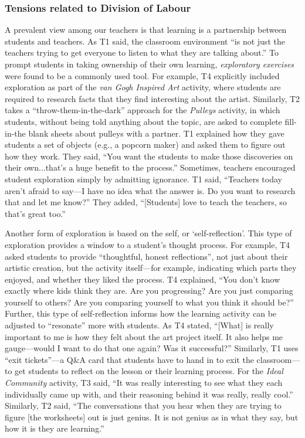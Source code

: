 \subsubsection{Tensions related to Division of Labour}
\label{sec:13}
A prevalent view among our teachers is that learning is a partnership between students and teachers.  As T1 said, the classroom environment ``is not just the teachers trying to get everyone to listen to what they are talking about.'' To prompt students in taking ownership of their own learning, \textit{exploratory exercises} were found to be a commonly used tool.  For example, T4 explicitly included exploration as part of the \textit{van Gogh Inspired Art} activity, where students are required to research facts that they find interesting about the artist.  Similarly, T2 takes a ``throw-them-in-the-dark'' approach for the \textit{Pulleys} activity, in which students, without being told anything about the topic, are asked to complete fill-in-the blank sheets about pulleys with a partner. T1 explained how they gave students a set of objects (e.g., a popcorn maker) and asked them to figure out how they work.  They said, ``You want the students to make those discoveries on their own...that's a huge benefit to the process.'' Sometimes, teachers encouraged student exploration simply by admitting ignorance. T1 said, ``Teachers today aren't afraid to say---I have no idea what the answer is.  Do you want to research that and let me know?'' They added, ``[Students] love to teach the teachers, so that's great too.'' 

Another form of exploration is based on the self, or `self-reflection'. This type of exploration provides a window to a student's thought process. For example, T4 asked students to provide ``thoughtful, honest reflections'', not just about their artistic creation, but the activity itself---for example, indicating which parts they enjoyed, and whether they liked the process. T4 explained, ``You don't know exactly where kids think they are.  Are you progressing?  Are you just comparing yourself to others?  Are you comparing yourself to what you think it should be?''  Further, this type of self-reflection informs how the learning activity can be adjusted to ``resonate'' more with students.  As T4 stated, ``[What] is really important to me is how they felt about the art project itself.  It also helps me gauge---would I want to do that one again? Was it successful?'' Similarly, T1 uses ``exit tickets''---a Q\&A card that students have to hand in to exit the classroom---to get students to reflect on the lesson or their learning process. For the \textit{Ideal Community} activity, T3 said, ``It was really interesting to see what they each individually came up with, and their reasoning behind it was really, really cool.'' Similarly, T2 said, ``The conversations that you hear when they are trying to figure [the worksheets] out is just genius.  It is not genius as in what they say, but how it is they are learning.'' \\ 



